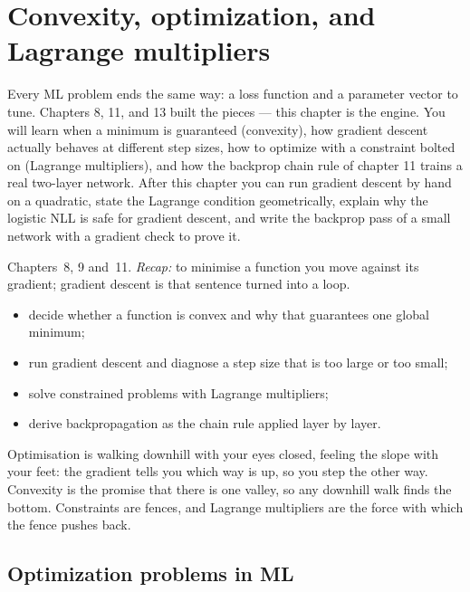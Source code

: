 \chapter{Convexity, optimization, and Lagrange multipliers}\label{ch:optim}

Every ML problem ends the same way: a loss function and a parameter
vector to tune. Chapters 8, 11, and 13 built the pieces --- this chapter
is the engine. You will learn when a minimum is guaranteed (convexity),
how gradient descent actually behaves at different step sizes, how to
optimize with a constraint bolted on (Lagrange multipliers), and how the
backprop chain rule of chapter 11 trains a real two-layer network. After
this chapter you can run gradient descent by hand on a quadratic, state
the Lagrange condition geometrically, explain why the logistic NLL is
safe for gradient descent, and write the backprop pass of a small
network with a gradient check to prove it.

\begin{rulebox}
Chapters~8, 9 and~11. \emph{Recap:} to minimise a function you move against its gradient; gradient descent is that sentence turned into a loop.
\end{rulebox}
\begin{wins}
\begin{itemize}
\item decide whether a function is convex and why that guarantees one global minimum;
\item run gradient descent and diagnose a step size that is too large or too small;
\item solve constrained problems with Lagrange multipliers;
\item derive backpropagation as the chain rule applied layer by layer.
\end{itemize}
\end{wins}
\begin{principle}
Optimisation is walking downhill with your eyes closed, feeling the slope with your feet: the gradient tells you which way is up, so you step the other way. Convexity is the promise that there is one valley, so any downhill walk finds the bottom. Constraints are fences, and Lagrange multipliers are the force with which the fence pushes back.
\end{principle}

\section{Optimization problems in ML}\label{sec:opt-ml}

